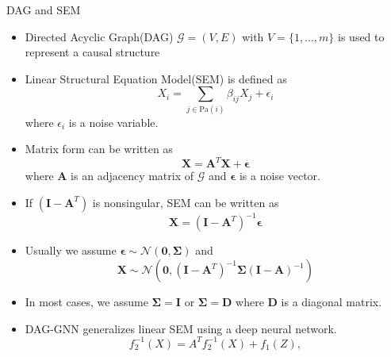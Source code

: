 \documentclass{beamer}
\begin{document}
\begin{frame}[allowframebreaks]{DAG and SEM}
    \begin{itemize}
        \item Directed Acyclic Graph(DAG) $\mathcal G = (V, E)$ with $V = \{1, \dots, m\}$ is used to represent a causal structure \cite{pearl_2009}
        \item Linear Structural Equation Model(SEM) is defined as
        \begin{equation*}
            X_i = \sum_{j \in \text{Pa}(i)} \beta_{ij} X_j + \epsilon_i
        \end{equation*}
        where $\epsilon_i$ is a noise variable.
        \item Matrix form can be written as
        \begin{equation*}
            \mathbf X = \mathbf A^T \mathbf X + \mathbf \epsilon
        \end{equation*}
        where $\mathbf A$ is an adjacency matrix of $\mathcal G$ and $\mathbf \epsilon$ is a noise vector.
    \end{itemize}
    \framebreak
    \begin{itemize}
        \item If $(\mathbf I-\mathbf A^T)$ is nonsingular, SEM can be written as
        \begin{equation*}
            \mathbf X = (\mathbf I - \mathbf A^T)^{-1} \mathbf \epsilon
        \end{equation*}
        \item Usually we assume $\mathbf \epsilon \sim \mathcal N(\mathbf 0, \mathbf \Sigma)$ and
        \begin{equation*}
            \mathbf X \sim \mathcal N(\mathbf 0, (\mathbf I - \mathbf A^T)^{-1} \mathbf \Sigma (\mathbf I - \mathbf A)^{-1})
        \end{equation*}
        \item In most cases, we assume $\mathbf \Sigma = \mathbf I$ or $\mathbf \Sigma = \mathbf D$ where $\mathbf D$ is a diagonal matrix.
        \item DAG-GNN \cite{yu2019daggnn} generalizes linear SEM using a deep neural network.
        \begin{equation*}
            f_2^{-1}(X) = A^Tf_2^{-1}(X) + f_1(Z),
        \end{equation*}
    \end{itemize}
\end{frame}
\end{document}

